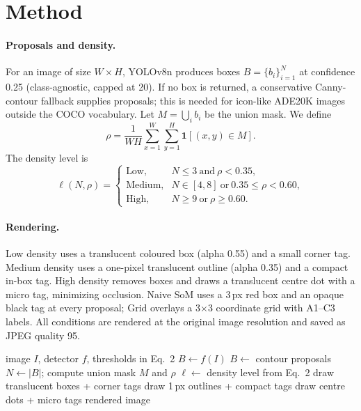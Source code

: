 \documentclass[10pt,twocolumn]{article}
\begin{document}
\section{Method}
\label{sec:method}
\paragraph{Proposals and density.}
For an image of size $W\times H$, YOLOv8n \cite{jocher2023yolov8} produces boxes $B=\{b_i\}_{i=1}^{N}$ at confidence 0.25 (class-agnostic, capped at 20). If no box is returned, a conservative Canny-contour fallback supplies proposals; this is needed for icon-like ADE20K images outside the COCO vocabulary. Let $M=\bigcup_i b_i$ be the union mask. We define
\begin{equation}
\rho = \frac{1}{WH}\sum_{x=1}^{W}\sum_{y=1}^{H}\mathbf{1}\left[(x,y)\in M\right].
\end{equation}
The density level is
\begin{equation}
\ell(N,\rho)=
\begin{cases}
\text{Low}, & N\le 3 \ \text{and}\ \rho<0.35,\\
\text{Medium}, & N\in[4,8]\ \text{or}\ 0.35\le\rho<0.60,\\
\text{High}, & N\ge 9\ \text{or}\ \rho\ge0.60.
\end{cases}
\end{equation}

\paragraph{Rendering.}
Low density uses a translucent coloured box (alpha 0.55) and a small corner tag. Medium density uses a one-pixel translucent outline (alpha 0.35) and a compact in-box tag. High density removes boxes and draws a translucent centre dot with a micro tag, minimizing occlusion. Naive SoM uses a 3\,px red box and an opaque black tag at every proposal; Grid overlays a 3$\times$3 coordinate grid with A1--C3 labels. All conditions are rendered at the original image resolution and saved as JPEG quality 95.

\begin{algorithm}[t]
\caption{Density-aware visual prompting}
\label{alg:avp}
\begin{algorithmic}[1]
\Require image $I$, detector $f$, thresholds in Eq.~2
\State $B \gets f(I)$ 
 $B\gets$ contour proposals \EndIf
\State $N\gets|B|$; compute union mask $M$ and $\rho$
\State $\ell\gets$ density level from Eq.~2
 draw translucent boxes + corner tags
 draw 1\,px outlines + compact tags
\Else draw centre dots + micro tags
\EndIf
\State \Return rendered image
\end{algorithmic}
\end{algorithm}
\end{document}

